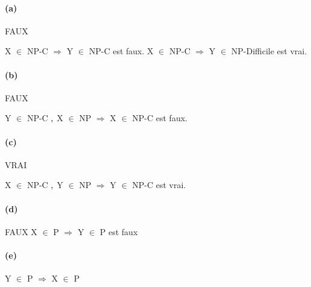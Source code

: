 \paragraph{(a)}

FAUX

X $\in$ NP-C $\Rightarrow$ Y $\in$ NP-C est faux. 
X $\in$ NP-C $\Rightarrow$ Y $\in$ NP-Difficile est vrai. 

\paragraph{(b)}

FAUX

Y $\in$ NP-C $\and$ X $\in$ NP $\Rightarrow$ X $\in$ NP-C est faux.

\paragraph{(c)}

VRAI

X $\in$ NP-C $\and$ Y $\in$ NP $\Rightarrow$ Y $\in$ NP-C est vrai.

\paragraph{(d)}

FAUX
X $\in$ P $\Rightarrow$ Y $\in$ P est faux

\paragraph{(e)}

Y $\in$ P $\Rightarrow$ X $\in$ P